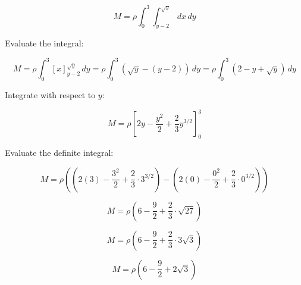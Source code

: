 \documentclass{article}
\begin{document}
\[
M = \rho \int_{0}^{3} \int_{y-2}^{\sqrt{y}} \, dx \, dy
\]



Evaluate the integral:


\[
M = \rho \int_{0}^{3} \left[ x \right]_{y-2}^{\sqrt{y}} \, dy = \rho \int_{0}^{3} \left( \sqrt{y} - (y - 2) \right) \, dy = \rho \int_{0}^{3} (2 - y + \sqrt{y}) \, dy
\]



Integrate with respect to \( y \):


\[
M = \rho \left[ 2y - \frac{y^2}{2} + \frac{2}{3}y^{3/2} \right]_{0}^{3}
\]



Evaluate the definite integral:


\[
M = \rho \left( \left( 2(3) - \frac{3^2}{2} + \frac{2}{3} \cdot 3^{3/2} \right) - \left( 2(0) - \frac{0^2}{2} + \frac{2}{3} \cdot 0^{3/2} \right) \right)
\]




\[
M = \rho \left( 6 - \frac{9}{2} + \frac{2}{3} \cdot \sqrt{27} \right)
\]




\[
M = \rho \left( 6 - \frac{9}{2} + \frac{2}{3} \cdot 3\sqrt{3} \right)
\]




\[
M = \rho \left( 6 - \frac{9}{2} + 2\sqrt{3} \right)
\]
\end{document}
